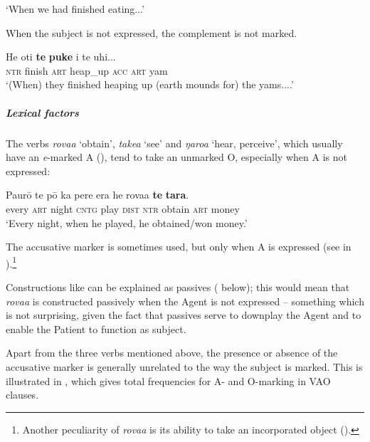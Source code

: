 \glt
‘When we had finished eating...’ \textstyleExampleref{[R157.032]} 
\z

When the subject is not expressed, the complement is not marked. 

\ea\label{ex:8.38}
\gll He oti \textbf{te} \textbf{puke} i te {\ꞌ}uhi... \\
\textsc{ntr} finish \textsc{art} heap\_up \textsc{acc} \textsc{art} yam \\

\glt 
‘(When) they finished heaping up (earth mounds for) the yams....’ \textstyleExampleref{[Mtx-2-01.010]}
\z

\subparagraph{Lexical factors} The verbs \textit{rova{\ꞌ}a} ‘obtain’, \textit{take{\ꞌ}a} ‘see’ and \textit{ŋaro{\ꞌ}a} ‘hear, perceive’, which usually have an \textit{e}{}-marked A (), tend to take an unmarked O, especially when A is not expressed:

\ea\label{ex:8.39}
\gll Paurō te pō ka pere era he rova{\ꞌ}a \textbf{te} \textbf{tara}.\\
every \textsc{art} night \textsc{cntg} play \textsc{dist} \textsc{ntr} obtain \textsc{art} money\\

\glt
‘Every night, when he played, he obtained/won money.’ \textstyleExampleref{[R250.146]} 
\z

The accusative marker is sometimes used, but only when A is expressed (see  in ).\footnote{\label{fn:406}Another peculiarity of \textit{rova{\ꞌ}a} is its ability to take an incorporated object ().} 

Constructions like  can be explained as passives ( below); this would mean that \textit{rova{\ꞌ}a} is constructed passively when the Agent is not expressed – something which is not surprising, given the fact that passives serve to downplay the Agent and to enable the Patient to function as subject.

Apart from the three verbs mentioned above, the presence or absence of the accusative marker is generally unrelated to the way the subject is marked. This is illustrated in , which gives total frequencies for A- and O-marking in VAO clauses.

